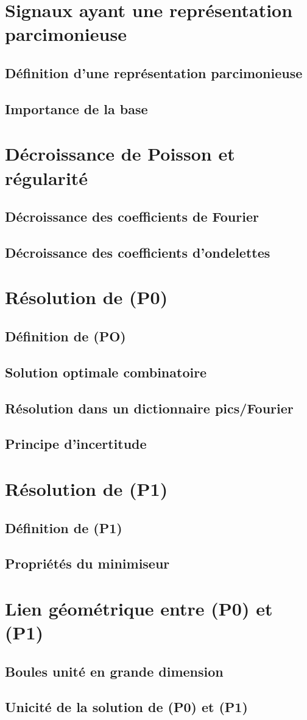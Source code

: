 \section{Signaux ayant une représentation parcimonieuse}
\subsection{Définition d'une représentation parcimonieuse}
\subsection{Importance de la base}

\section{Décroissance de Poisson et régularité}
\subsection{Décroissance des coefficients de Fourier}
\subsection{Décroissance des coefficients d'ondelettes}

\section{Résolution de (P0)}
\subsection{Définition de (PO)}
\subsection{Solution optimale combinatoire}
\subsection{Résolution dans un dictionnaire pics/Fourier}
\subsection{Principe d'incertitude}

\section{Résolution de (P1)}
\subsection{Définition de (P1)}
\subsection{Propriétés du minimiseur}

\section{Lien géométrique entre (P0) et (P1)}
\subsection{Boules unité en grande dimension}
\subsection{Unicité de la solution de (P0) et (P1)}


